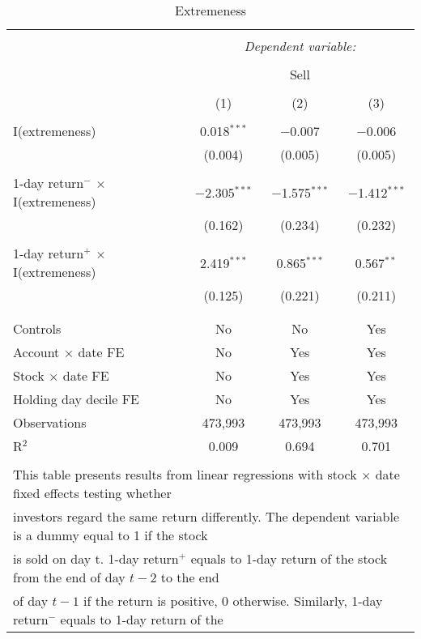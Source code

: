 
\begin{table}[!htbp] \centering 
	\footnotesize
	\caption{Extremeness } 
	\label{} 
	\begin{tabular}{@{\extracolsep{50pt}}lccc} 
		\\[-1.8ex]\hline 
\hline \\[-1.8ex] 
& \multicolumn{3}{c}{\textit{Dependent variable:}} \\ 
\cline{2-4} 
\\[-1.8ex] & \multicolumn{3}{c}{Sell}  \\
\cline{2-4}
\\[-1.8ex] & (1) & (2) & (3)\\ 
\hline \\[-1.8ex] 
		

		I(extremeness)  & 0.018$^{***}$ & $-$0.007 & $-$0.006 \\ 
		& (0.004) & (0.005) & (0.005) \\ 
		& & & \\ 
		1-day return$^-$ $\times$ I(extremeness)  & $-$2.305$^{***}$ & $-$1.575$^{***}$ & $-$1.412$^{***}$ \\ 
		& (0.162) & (0.234) & (0.232) \\ 
		& & & \\ 
		1-day return$^+$ $\times$ I(extremeness)  & 2.419$^{***}$ & 0.865$^{***}$ & 0.567$^{**}$ \\ 
		& (0.125) & (0.221) & (0.211) \\ 
		& & & \\ 
	
		\hline \\[-1.8ex] 	
		Controls  & No & No & Yes \\
		Account $\times$ date FE  & No & Yes & Yes \\ 
		Stock $\times$ date FE  & No & Yes & Yes \\ 
		Holding day decile FE   & No & Yes & Yes\\
        Observations & 473,993 & 473,993 & 473,993 \\ 
        R$^{2}$ & 0.009 & 0.694 & 0.701 \\ 
		\hline 
		\hline \\[-1.8ex] 
		\multicolumn{4}{l}{This table presents results from linear regressions with stock $\times$ date fixed effects testing whether  }\\
		\multicolumn{4}{l}{ investors regard the same return differently. The dependent variable is a dummy equal to 1 if the stock }\\ 
	\multicolumn{4}{l}{ is sold on day t.  1-day return$^+$ equals to 1-day return of the stock from the end of day $t-2$ to the end }\\
	\multicolumn{4}{l}{of day $t-1$ if the return is positive, 0 otherwise. Similarly, 1-day return$^-$ equals to 1-day return of the  }\\
	

\end{tabular}
\end{table}
